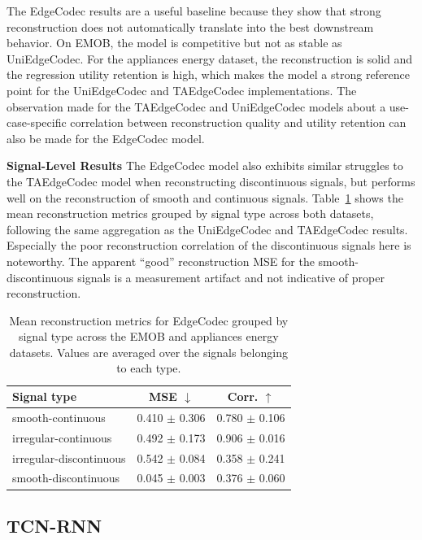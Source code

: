 The EdgeCodec results are a useful baseline because they show that strong reconstruction does not automatically translate into the best downstream behavior. On EMOB, the model is competitive but not as stable as UniEdgeCodec. For the appliances energy dataset, the reconstruction is solid and the regression utility retention is high, which makes the model a strong reference point for the UniEdgeCodec and TAEdgeCodec implementations. The observation made for the TAEdgeCodec and UniEdgeCodec models about a use-case-specific correlation between reconstruction quality and utility retention can also be made for the EdgeCodec model. 

\textbf{Signal-Level Results} The EdgeCodec model also exhibits similar struggles to the TAEdgeCodec model when reconstructing discontinuous signals, but performs well on the reconstruction of smooth and continuous signals. Table~\ref{tab:edge-signal-specific} shows the mean reconstruction metrics grouped by signal type across both datasets, following the same aggregation as the UniEdgeCodec and TAEdgeCodec results. Especially the poor reconstruction correlation of the discontinuous signals here is noteworthy. The apparent ``good'' reconstruction MSE for the smooth-discontinuous signals is a measurement artifact and not indicative of proper reconstruction.

\begin{table}[htbp]
\centering
\small
\caption{Mean reconstruction metrics for EdgeCodec grouped by signal type across the EMOB and appliances energy datasets. Values are averaged over the signals belonging to each type.}
\label{tab:edge-signal-specific}
\begin{tabular}{lcc}
\toprule
\textbf{Signal type} & \textbf{MSE} $\downarrow$ & \textbf{Corr.} $\uparrow$ \\
\midrule
smooth-continuous       & 0.410 $\pm$ 0.306 & 0.780 $\pm$ 0.106 \\
irregular-continuous    & 0.492 $\pm$ 0.173 & 0.906 $\pm$ 0.016 \\
irregular-discontinuous & 0.542 $\pm$ 0.084 & 0.358 $\pm$ 0.241 \\
smooth-discontinuous    & 0.045 $\pm$ 0.003 & 0.376 $\pm$ 0.060 \\
\bottomrule
\end{tabular}
\end{table}

\subsection{TCN-RNN}


